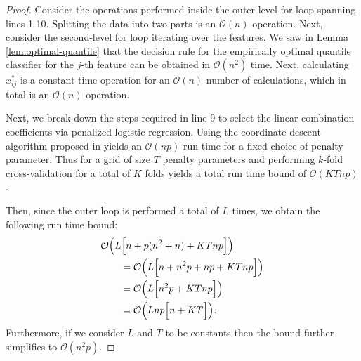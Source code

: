 \begin{proof}
  Consider the operations performed inside the outer-level for loop spanning
  lines 1-10.  Splitting the data into two parts is an $\mathcal{O}(n)$
  operation.  Next, consider the second-level for loop iterating over the
  features.  We saw in Lemma \ref{lem:optimal-quantile} that the decision rule
  for the empirically optimal quantile classifier for the $j$-th feature can be
  obtained in $\mathcal{O}(n^2)$ time.  Next, calculating $x_{ij}^{*}$ is a
  constant-time operation for an $\mathcal{O}(n)$ number of calculations, which
  in total is an $\mathcal{O}(n)$ operation.

  Next, we break down the steps required in line 9 to select the linear
  combination coefficients via penalized logistic regression.  Using the
  coordinate descent algorithm proposed in \cite{friedman2007, friedman2010}
  yields an $\mathcal{O}(np)$ run time for a fixed choice of penalty parameter.
  Thus for a grid of size $T$ penalty parameters and performing $k$-fold
  cross-validation for a total of $K$ folds yields a total run time bound of
  $\mathcal{O}(KTnp)$.

  Then, since the outer loop is performed a total of $L$ times, we obtain the
  following run time bound:
  \begin{align}
    \label{eq:classifier-runtime}
    \begin{split} \MoveEqLeft
      \mathcal{O}\Big( L \Big[ n + p(n^2 + n) + KTnp \Big] \Big) \\
      &= \mathcal{O}\Big( L \Big[ n + n^2 p + np + KTnp \Big] \Big) \\
      &= \mathcal{O}\Big( L \Big[ n^2 p + KTnp \Big] \Big) \\
      &= \mathcal{O}\Big( Lnp \Big[ n + KT \Big] \Big).
    \end{split}
  \end{align}
  Furthermore, if we consider $L$ and $T$ to be constants then the bound further
  simplifies to $\mathcal{O}(n^2 p)$.
\end{proof}

